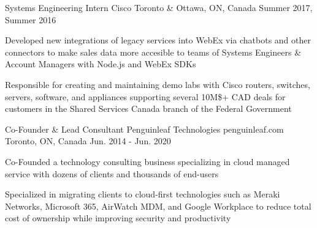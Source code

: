 \begin{cventries}
  \cventry
    {Systems Engineering Intern} %
    {Cisco} %
    {} %
    {Toronto \& Ottawa, ON, Canada} %
    {Summer 2017, Summer 2016} %
    {
      \begin{cvitems} %
        \item {Developed new integrations of legacy services into WebEx via chatbots and other connectors to make sales data more accesible to teams of Systems Engineers \& Account Managers with Node.js and WebEx SDKs}
        \item {Responsible for creating and maintaining demo labs with Cisco routers, switches, servers, software, and appliances supporting several 10M\$+ CAD deals for customers in the Shared Services Canada branch of the Federal Government}
      \end{cvitems}
    }

  \cventry
    {Co-Founder \& Lead Consultant} %
    {Penguinleaf Technologies} %
    {penguinleaf.com} %
    {Toronto, ON, Canada} %
    {Jun. 2014 - Jun. 2020} %
    {
      \begin{cvitems} %
        \item {Co-Founded a technology consulting business specializing in cloud managed service with dozens of clients and thousands of end-users}
        \item {Specialized in migrating clients to cloud-first technologies such as Meraki Networks, Microsoft 365, AirWatch MDM, and Google Workplace to reduce total cost of ownership while improving security and productivity}
      \end{cvitems}
    }

\end{cventries}
